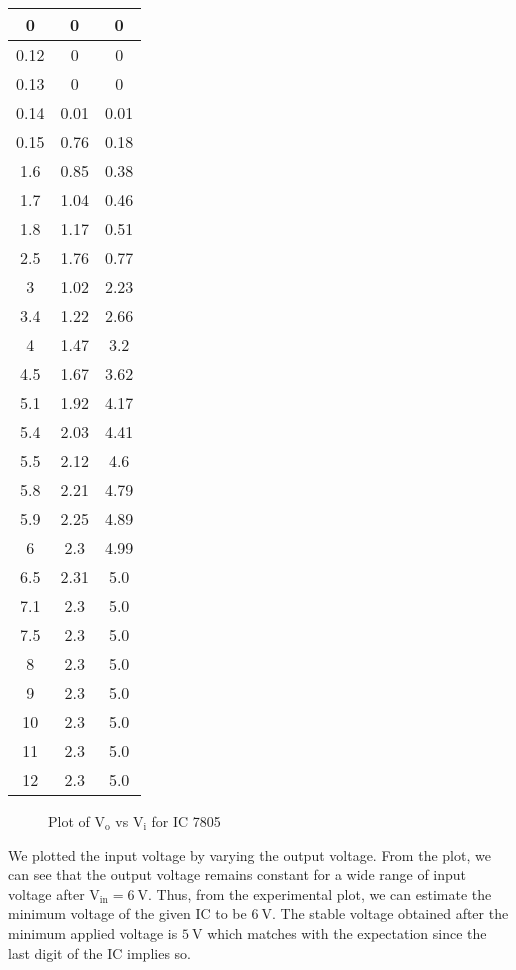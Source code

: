 \documentclass{scrartcl}
\begin{document}
\begin{longtable}{|c|c|c|}
        0         & 0         & 0         \\ \hline
        0.12      & 0         & 0         \\ \hline
        0.13      & 0         & 0         \\ \hline
        0.14      & 0.01      & 0.01      \\ \hline
        0.15      & 0.76      & 0.18      \\ \hline
        1.6       & 0.85      & 0.38      \\ \hline
        1.7       & 1.04      & 0.46      \\ \hline
        1.8       & 1.17      & 0.51      \\ \hline
        2.5       & 1.76      & 0.77      \\ \hline
        3         & 1.02      & 2.23      \\ \hline
        3.4       & 1.22      & 2.66      \\ \hline
        4         & 1.47      & 3.2       \\ \hline
        4.5       & 1.67      & 3.62      \\ \hline
        5.1       & 1.92      & 4.17      \\ \hline
        5.4       & 2.03      & 4.41      \\ \hline
        5.5       & 2.12      & 4.6       \\ \hline
        5.8       & 2.21      & 4.79      \\ \hline
        5.9       & 2.25      & 4.89      \\ \hline
        6         & 2.3       & 4.99      \\ \hline
        6.5       & 2.31      & 5.0         \\ \hline
        7.1       & 2.3       & 5.0        \\ \hline
        7.5       & 2.3       & 5.0         \\ \hline
        8         & 2.3       & 5.0         \\ \hline
        9         & 2.3       & 5.0         \\ \hline
        10        & 2.3       & 5.0         \\ \hline
        11        & 2.3       & 5.0         \\ \hline
        12        & 2.3       & 5.0         \\ \hline
        
        \end{longtable}
\begin{figure}[H]
        \centering
        
        \caption{Plot of $\mathrm{V_o}$ vs $\mathrm{V_i}$ for IC 7805}
\end{figure}
\noindent
We plotted the input voltage by varying the output voltage. From the plot, we can see that the output voltage remains constant for a wide range of input voltage after $\mathrm{V_{in}=6 \ \mathrm{V}}$. Thus, from the experimental plot, we can estimate the minimum voltage of the given IC to be $6 \ \mathrm{V}$. The stable voltage obtained after the minimum applied voltage is $5 \ \mathrm{V}$ which matches with the expectation since the last digit of the IC implies so.
\end{document}
